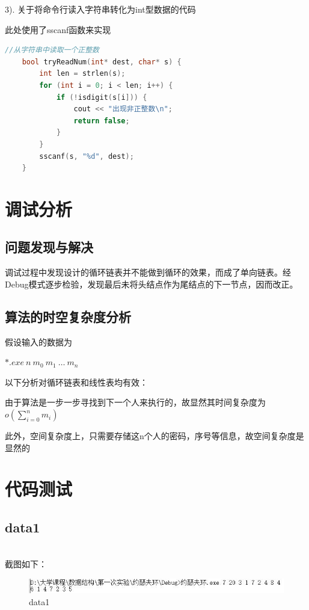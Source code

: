 \documentclass[UTF8]{article}
\begin{document}
	3). 关于将命令行读入字符串转化为int型数据的代码\par
	此处使用了sscanf函数来实现\par
	\begin{lstlisting}[language=C++]
	//从字符串中读取一个正整数
	bool tryReadNum(int* dest, char* s) {
		int len = strlen(s);
		for (int i = 0; i < len; i++) {
			if (!isdigit(s[i])) {
				cout << "出现非正整数\n";
				return false;
			}
		}
		sscanf(s, "%d", dest);
	}
	\end{lstlisting}
	
	
	\section{调试分析}
	\subsection{问题发现与解决}
	调试过程中发现设计的循环链表并不能做到循环的效果，而成了单向链表。经Debug模式逐步检验，发现最后未将头结点作为尾结点的下一节点，因而改正。
	
	\subsection{算法的时空复杂度分析}
	假设输入的数据为
	\begin{center}
		$*.exe\ n\ m_{0}\ m_{1}\ \dots\ m_{n}$
	\end{center}\par
	以下分析对循环链表和线性表均有效：\par
	由于算法是一步一步寻找到下一个人来执行的，故显然其时间复杂度为$o(\sum_{i=0}^{n}m_{i})$\par
	此外，空间复杂度上，只需要存储这n个人的密码，序号等信息，故空间复杂度是显然的
	
	\section{代码测试}
	\subsection{data1}
	\\
	截图如下：
	\begin{figure}[H]
		\centering
		\includegraphics[scale=0.7]{data1.jpg}
		\caption{data1}
		\label{data1}
	\end{figure}\par
	
\end{document}
